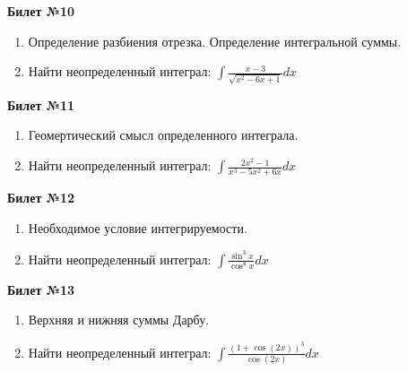\documentclass[a4paper, 12pt]{article}
\begin{document}
\begin{center}
	\textbf{Билет №10}
\end{center}
\begin{enumerate}
	\item Определение разбиения отрезка. Определение интегральной суммы.
	\item Найти неопределенный интеграл: $\displaystyle \int{\frac{x - 3}{\sqrt{x^2 - 6x + 1}} dx}$
\end{enumerate}

\begin{center}
	\textbf{Билет №11}
\end{center}
\begin{enumerate}
	\item Геомертический смысл определенного интеграла.
	\item Найти неопределенный интеграл: $\displaystyle \int{\frac{2x^2 - 1}{x^3 - 5x^2 +6x} dx}$
\end{enumerate}

\begin{center}
	\textbf{Билет №12}
\end{center}
\begin{enumerate}
	\item Необходимое условие интегрируемости.
	\item Найти неопределенный интеграл: $\displaystyle \int{\frac{\sin^3 x}{\cos^8 x} dx}$
\end{enumerate}

\begin{center}
	\textbf{Билет №13}
\end{center}
\begin{enumerate}
	\item Верхняя и нижняя суммы Дарбу.
	\item Найти неопределенный интеграл: $\displaystyle \int{\frac{(1 + \cos(2x))^3}{\cos(2x)}dx}$
\end{enumerate}
\end{document}
